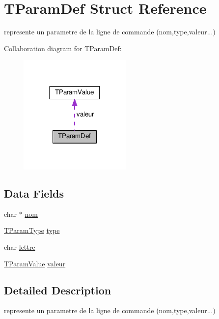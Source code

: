 \hypertarget{structTParamDef}{}\section{T\+Param\+Def Struct Reference}
\label{structTParamDef}


represente un parametre de la ligne de commande (nom,type,valeur...)  




Collaboration diagram for T\+Param\+Def\+:\nopagebreak
\begin{figure}[H]
\begin{center}
\leavevmode
\includegraphics[width=156pt]{structTParamDef__coll__graph}
\end{center}
\end{figure}
\subsection*{Data Fields}
\begin{DoxyCompactItemize}
\item 
char $\ast$ \hyperlink{structTParamDef_afa78db012abc7fecd18c60d6154e04f8}{nom}
\item 
\hyperlink{paramcmdl_8c_a07d4e5a29d675892ddc5f377533c06a5}{T\+Param\+Type} \hyperlink{structTParamDef_aaa8c69f39c6dd02a968dc15044810327}{type}
\item 
char \hyperlink{structTParamDef_a66254f6368c5542d3f14afdd1ea1e621}{lettre}
\item 
\hyperlink{unionTParamValue}{T\+Param\+Value} \hyperlink{structTParamDef_a3f5cbf75e393d35bb230dfe293f7c7ba}{valeur}
\end{DoxyCompactItemize}


\subsection{Detailed Description}
represente un parametre de la ligne de commande (nom,type,valeur...) 

